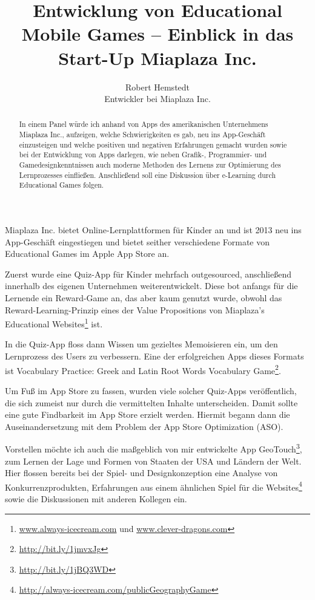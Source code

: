 \documentclass[12pt,a4paper]{article}
\author{Robert Hemstedt\\ \small{Entwickler bei Miaplaza Inc.} }
\title{Entwicklung von Educational Mobile Games -- Einblick in das Start-Up Miaplaza Inc.}
\date{}
\begin{document}
\maketitle
\begin{abstract}
In einem Panel würde ich anhand von Apps des amerikanischen Unternehmens \linebreak Miaplaza Inc., aufzeigen, welche Schwierigkeiten es gab, neu ins App-Geschäft einzusteigen und welche positiven und negativen Erfahrungen gemacht wurden sowie bei der Entwicklung von Apps darlegen, wie neben Grafik-, Programmier- und Game\-design\-kennt\-nis\-sen auch moderne Methoden des Lernens zur Optimierung des Lernprozesses einfließen. Anschließend soll eine Diskussion über e-Learning durch Educational Games folgen.
\end{abstract}
Miaplaza Inc. bietet Online-Lernplattformen für Kinder an und ist 2013 neu ins App-Geschäft eingestiegen und bietet seither verschiedene Formate von Educational Games im Apple App Store an.

Zuerst wurde eine Quiz-App für Kinder mehrfach outgesourced, anschließend innerhalb des eigenen Unternehmen weiterentwickelt. Diese bot anfangs für die Lernende ein Reward-Game an, das aber kaum genutzt wurde, obwohl das Reward-Learning-Prinzip eines der Value Propositions von Miaplaza's Educational Websites\footnote{\url{www.always-icecream.com} und \url{www.clever-dragons.com} } ist. 

In die Quiz-App floss dann Wissen um gezieltes Memoisieren ein, um den Lernprozess des Users zu verbessern. Eine der erfolgreichen Apps dieses Formats ist \glqq Vocabulary Practice: Greek and Latin Root Words Vocabulary Game\grqq\footnote{\url{http://bit.ly/1jmvxJg}}. 

Um Fuß im App Store zu fassen, wurden viele solcher Quiz-Apps veröffentlich, die sich zumeist nur durch die vermittelten Inhalte unterscheiden. Damit sollte eine gute Findbarkeit im App Store erzielt werden. Hiermit begann dann die Auseinandersetzung mit dem Problem der App Store Optimization (ASO).
\newline

Vorstellen möchte ich auch die maßgeblich von mir entwickelte App \glqq GeoTouch\grqq\footnote{\label{geotouch}\url{http://bit.ly/1jBQ3WD}}, zum Lernen der Lage und Formen von Staaten der USA und Ländern der Welt. Hier flossen bereits bei der Spiel- und  Designkonzeption eine Analyse von Konkurrenzprodukten, Erfahrungen aus einem ähnlichen Spiel für die Websites\footnote{\url{http://always-icecream.com/publicGeographyGame}} sowie die Diskussionen mit anderen Kollegen ein. 
\end{document}
